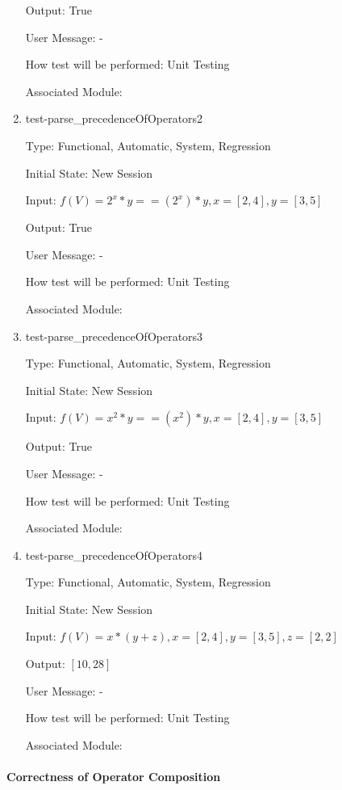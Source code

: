 \documentclass[12pt, titlepage]{article}
\begin{document}
\begin{enumerate}
	Output: True
	
	User Message: - 
	
	How test will be performed: Unit Testing
	
	Associated Module: \\
	
	\item{test-parse\_precedenceOfOperators2}
	
	Type: Functional, Automatic, System, Regression
	
	Initial State: New Session
	
	Input: $f(V) = 2^x * y == (2^x) * y, x = [2,4], y = [3,5]$
	
	Output: True
	
	User Message: - 
	
	How test will be performed: Unit Testing
	
	Associated Module: \\
	
	\item{test-parse\_precedenceOfOperators3}
	
	Type: Functional, Automatic, System, Regression
	
	Initial State: New Session
	
	Input: $f(V) = x^2 * y == (x^2) * y, x = [2,4], y = [3,5]$
	
	Output: True
	
	User Message: - 
	
	How test will be performed: Unit Testing
	
	Associated Module: \\
	
	\item{test-parse\_precedenceOfOperators4}
	
	Type: Functional, Automatic, System, Regression
	
	Initial State: New Session
	
	Input: $f(V) = x * (y + z), x = [2,4], y = [3,5], z = [2,2]$
	
	Output: $[10, 28]$
	
	User Message: - 
	
	How test will be performed: Unit Testing
	
	Associated Module: \\
	
\end{enumerate}


\paragraph{Correctness of Operator Composition}
\end{document}
